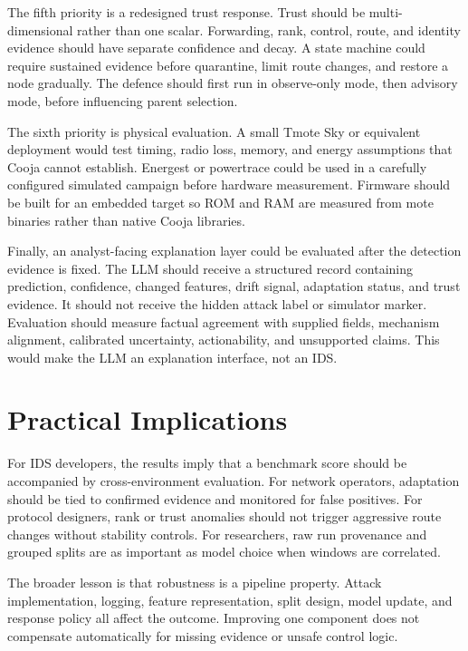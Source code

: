 The fifth priority is a redesigned trust response. Trust should be multi-dimensional rather than one scalar. Forwarding, rank, control, route, and identity evidence should have separate confidence and decay. A state machine could require sustained evidence before quarantine, limit route changes, and restore a node gradually. The defence should first run in observe-only mode, then advisory mode, before influencing parent selection.

The sixth priority is physical evaluation. A small Tmote Sky or equivalent deployment would test timing, radio loss, memory, and energy assumptions that Cooja cannot establish. Energest or powertrace could be used in a carefully configured simulated campaign before hardware measurement. Firmware should be built for an embedded target so ROM and RAM are measured from mote binaries rather than native Cooja libraries.

Finally, an analyst-facing explanation layer could be evaluated after the detection evidence is fixed. The LLM should receive a structured record containing prediction, confidence, changed features, drift signal, adaptation status, and trust evidence. It should not receive the hidden attack label or simulator marker. Evaluation should measure factual agreement with supplied fields, mechanism alignment, calibrated uncertainty, actionability, and unsupported claims. This would make the LLM an explanation interface, not an IDS.

\section{Practical Implications}

For IDS developers, the results imply that a benchmark score should be accompanied by cross-environment evaluation. For network operators, adaptation should be tied to confirmed evidence and monitored for false positives. For protocol designers, rank or trust anomalies should not trigger aggressive route changes without stability controls. For researchers, raw run provenance and grouped splits are as important as model choice when windows are correlated.

The broader lesson is that robustness is a pipeline property. Attack implementation, logging, feature representation, split design, model update, and response policy all affect the outcome. Improving one component does not compensate automatically for missing evidence or unsafe control logic.
